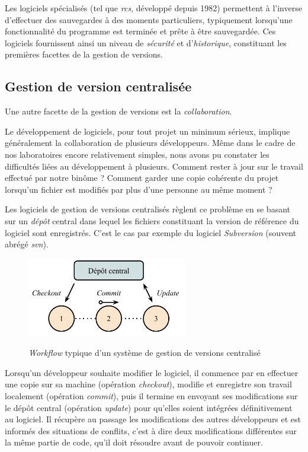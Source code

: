 \documentclass[11pt,a4paper]{article}
\begin{document}
Les logiciels spécialisés (tel que \textit{rcs}, développé depuis 1982) permettent à l'inverse d'effectuer des sauvegardes à des moments particuliers, typiquement lorsqu'une fonctionnalité du programme est terminée et prête à être sauvegardée.
Ces logiciels fournissent ainsi un niveau de \textit{sécurité} et d'\textit{historique}, constituant les premières facettes de la gestion de versions.

\subsection{Gestion de version centralisée}

Une autre facette de la gestion de versions est la \textit{collaboration}. 

Le développement de logiciels, pour tout projet un minimum sérieux, implique généralement la collaboration de plusieurs développeurs.
Même dans le cadre de nos laboratoires encore relativement simples, nous avons pu constater les difficultés liées au développement à plusieurs.
Comment rester à jour sur le travail effectué par notre binôme ?
Comment garder une copie cohérente du projet lorsqu'un fichier est modifiés par plus d'une personne au même moment ?

Les logiciels de gestion de versions centralisés règlent ce problème en se basant sur un \textit{dépôt} central dans lequel les fichiers constituant la version de référence du logiciel sont enregistrés.
C'est le cas par exemple du logiciel \textit{Subversion} (souvent abrégé \textit{svn}).

\begin{figure}[H]
\begin{center}
\includegraphics[width=7cm]{img_cvcs} \\
\caption{\small \textit{Workflow} typique d'un système de gestion de versions centralisé}
\end{center}
\end{figure}

Lorsqu'un développeur souhaite modifier le logiciel, il commence par en effectuer une copie sur sa machine (opération \textit{checkout}), modifie et enregistre son travail localement (opération \textit{commit}), puis il termine en envoyant ses modifications sur le dépôt central (opération \textit{update}) pour qu'elles soient intégrées définitivement au logiciel.
Il récupère au passage les modifications des autres développeurs et est informés des situations de conflits, c'est à dire deux modifications différentes sur la même partie de code, qu'il doit résoudre avant de pouvoir continuer.
\end{document}
